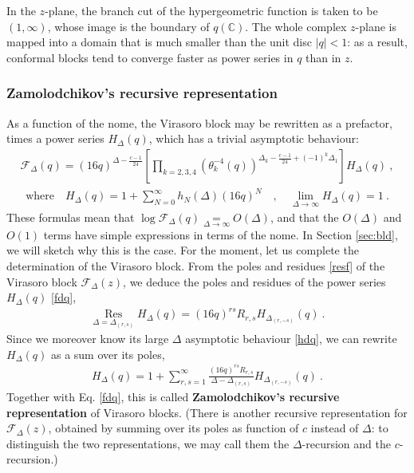 \documentclass[12pt, a4paper]{article}
\newcommand{\myindex}[1]{\textbf{\boldmath #1}}
\theoremstyle{break}
\begin{document}
In the $z$-plane, the branch cut of the hypergeometric function is taken to be $(1,\infty)$, whose image is the boundary of $q(\mathbb{C})$. The whole complex $z$-plane is mapped into a domain that is much smaller than the unit disc $|q|<1$: as a result, conformal blocks tend to converge faster as power series in $q$ than in $z$.
 
\subsubsection{Zamolodchikov's recursive representation}\label{sec:zrr}

As a function of the nome, the Virasoro block 
may be rewritten as a prefactor, times a power series $H_\Delta(q)$, which has a trivial asymptotic behaviour:
\begin{align}
 \boxed{\mathcal{F}_\Delta(q) = (16q)^{\Delta-\frac{c-1}{24}} \left[\prod_{k=2,3,4} \left(\theta_k^{-4}(q)\right)^{\Delta_k-\frac{c-1}{24}+(-1)^k \Delta_1} \right] H_\Delta(q)}\ ,
 \label{fdq}
\end{align}
\begin{align}
 \text{where} \quad \boxed{H_\Delta(q) = 1 + \sum_{N=0}^\infty h_N(\Delta)(16q)^N}  \quad , \quad \boxed{\lim_{\Delta\to\infty} H_\Delta(q) = 1}\ . 
 \label{hdq}
\end{align}
These formulas mean that 
$\log \mathcal{F}_\Delta(q) \underset{\Delta\to\infty}{=} O(\Delta)$, and that the $O(\Delta)$ and $O(1)$ terms have simple expressions in terms of the nome. 
In Section \ref{sec:bld}, we will sketch why this is the case. For the moment, let us complete the determination of the Virasoro block.
From the poles and residues \eqref{resf} of the Virasoro block $\mathcal{F}_\Delta(z)$, we deduce the poles and residues of the power series $H_\Delta(q)$ \eqref{fdq},
\begin{align}
 \underset{\Delta=\Delta_{(r,s)}}{\operatorname{Res}} H_\Delta(q) = (16q)^{rs} R_{r,s}H_{\Delta_{(r,-s)}}(q)\ .
\end{align}
Since we moreover know its large $\Delta$ asymptotic behaviour \eqref{hdq}, we can rewrite $H_\Delta(q)$ as a sum over its poles,
\begin{align}
 \boxed{H_\Delta(q) = 1 + \sum_{r,s=1}^\infty \frac{(16q)^{rs} R_{r,s}}{\Delta-\Delta_{(r,s)}} H_{\Delta_{(r,-s)}}(q)}\ . 
 \label{hrec}
\end{align}
Together with Eq. \eqref{fdq}, this is called \myindex{Zamolodchikov's recursive representation} of Virasoro blocks. (There is another recursive representation for $\mathcal{F}_\Delta(z)$, obtained by summing over its poles as function of $c$ instead of $\Delta$: to distinguish the two representations, we may call them the $\Delta$-recursion and the $c$-recursion.)
\end{document}
